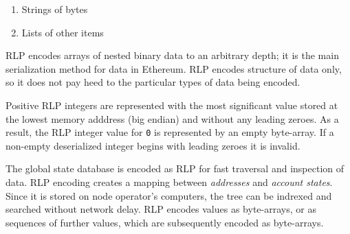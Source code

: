\documentclass[10pt,letterpaper,leqno,bibliography=totoc]{scrartcl}
\newenvironment{alphafootnotes}
{\par\edef\savedfootnotenumber{\number\value{footnote}}
\renewcommand{\thefootnote}{\alph{footnote}}
\setcounter{footnote}{0}}
{\par\setcounter{footnote}{\savedfootnotenumber}}
\begin{document}
\begin{alphafootnotes}
\begin{multicols*}{2}
			\begin{enumerate}
				\item Strings of bytes
				\item Lists of other items						\end{enumerate}
				
				RLP encodes arrays of nested binary data to an arbitrary depth; it is the main serialization method for data in Ethereum. RLP encodes structure of data only, so it does not pay heed to the particular types of data being encoded. 

		Positive RLP integers are represented with the most significant value stored at the lowest memory adddress (big endian)  and without any leading zeroes. As a result, the RLP integer value for \texttt{0} is represented by an empty byte-array. If a non-empty deserialized integer begins with leading zeroes it is invalid.\supercite{EF2017}


			The global state database is encoded as RLP for fast traversal and inspection of data. RLP encoding creates a mapping between \textit{addresses} and \textit{account states}. Since it is stored on node operator's computers, the tree can be indrexed and searched without network delay. RLP encodes values as byte-arrays, or as sequences of further values, which are subsequently encoded as byte-arrays. \supercite{Wood2017} 


%
			

\end{multicols*}
\end{alphafootnotes}
\end{document}
